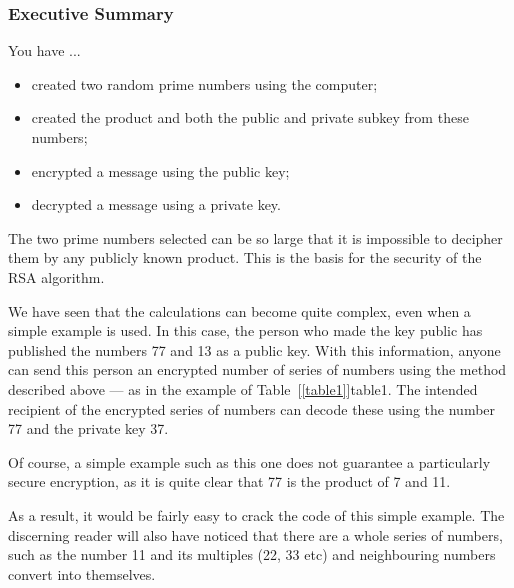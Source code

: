 \documentclass[a4paper,11pt,oneside,openright,titlepage]{scrbook}
\begin{document}
\clearpage
\subsubsection{Executive Summary}

You have ...

\begin{itemize}
\item created two random prime numbers using the computer;
\item created the product and both the public and private subkey from
    these numbers;
\item encrypted a message using the public key;
\item decrypted a message using a private key.
\end{itemize}

The two prime numbers selected can be so large that it is impossible
to decipher them by any publicly known product. This is the basis for
the security of the RSA algorithm.

We have seen that the calculations can become quite complex, even when
a simple example is used. In this case, the person who made the key
public has published the numbers 77 and 13 as a public key. With this
information, anyone can send this person an encrypted number of series
of numbers using the method described above --- as in the example of
Table~[\ref{table1}]{table1}. The intended recipient of the
encrypted series of numbers can decode these using the number 77 and
the private key 37.


Of course, a simple example such as this one does not guarantee a
particularly secure encryption, as it is quite clear that 77 is the
product of 7 and 11.

As a result, it would be fairly easy to crack the code of this simple
example. The discerning reader will also have noticed that there are a
whole series of numbers, such as the number 11 and its multiples (22,
33 etc) and neighbouring numbers convert into themselves.
\end{document}
